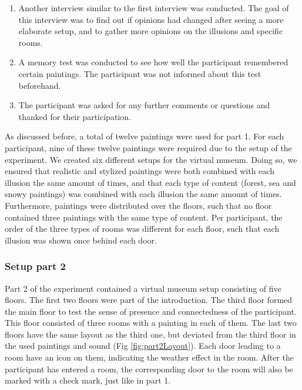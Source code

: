 \documentclass[a4paper]{article}
\begin{document}
\begin{enumerate}
\item Another interview similar to the first interview was conducted. The goal of this interview was to find out if opinions had changed after seeing a more elaborate setup, and to gather more opinions on the illusions and specific rooms.
\item A memory test was conducted to see how well the participant remembered certain paintings. The participant was not informed about this test beforehand.
\item The participant was asked for any further comments or questions and thanked for their participation.
\end{enumerate}

As discussed before, a total of twelve paintings were used for part 1. For each participant, nine of these twelve paintings were required due to the setup of the experiment. We created six different setups for the virtual museum. Doing so, we ensured that realistic and stylized paintings were both combined with each illusion the same amount of times, and that each type of content (forest, sea and snowy paintings) was combined with each illusion the same amount of times. Furthermore, paintings were distributed over the floors, such that no floor contained three paintings with the same type of content. Per participant, the order of the three types of rooms was different for each floor, such that each illusion was shown once behind each door.

\subsubsection{Setup part 2}\label{sec:setup2}

Part 2 of the experiment contained a virtual museum setup consisting of five floors. The first two floors were part of the introduction. The third floor formed the main floor to test the sense of presence and connectedness of  the participant. This floor consisted of three rooms with a painting in each of them. The last two floors have the same layout as the third one, but deviated from the third floor in the used paintings and sound (Fig \ref{fig:part2Layout}). Each door leading to a room have an icon on them, indicating the weather effect in the room. After the participant has entered a room, the corresponding door to the room will also be marked with a check mark, just like in part 1.  
\end{document}

